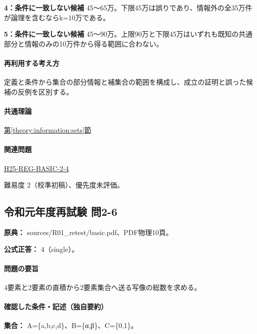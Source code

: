\noindent\textbf{4：条件に一致しない候補} 45〜65万。下限45万は誤りであり、情報外の全35万件が論理を含むならk=\allowbreak{}10万である。\par

\noindent\textbf{5：条件に一致しない候補} 45〜90万。上限90万と下限45万はいずれも既知の共通部分と情報のみの10万件から得る範囲に合わない。\par

\paragraph{再利用する考え方} 定義と条件から集合の部分情報と補集合の範囲を構成し、成立の証明と誤った候補の反例を区別する。

\paragraph{共通理論} \hyperref[theory:information:sets]{第\ref*{theory:information:sets}節}

\paragraph{関連問題} \hyperref[q:h25-reg-basic-2-4]{H25-REG-BASIC-2-4}

\par 難易度 2（校準初稿）、優先度未評価。

\subsection{令和元年度再試験 問2-6}
\label{q:r01-ret-basic-2-6}

\noindent\textbf{原典：} sources/R01\_retest/basic.pdf、PDF物理10頁。

\textbf{公式正答：} 4（single）。

\paragraph{問題の要旨} 4要素と2要素の直積から2要素集合へ送る写像の総数を求める。

\paragraph{確認した条件・記述（独自要約）}\mbox{}\par

\noindent\textbf{集合：} A=\{a,b,c,d\}、B=\{α,β\}、C=\{0,1\}。\par

